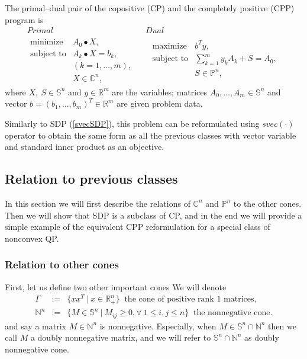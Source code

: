 \documentclass[12pt]{book}
\theoremstyle{definition}
\begin{document}
\label{defCPandCPP}
The primal--dual pair of the copositive (CP) and the completely positive (CPP) program is
\begin{equation}
\label{cp&cpp} 
\begin{array}{cc}
Primal & Dual \\
\begin{array}{ll}
\mbox{minimize} & A_0\bullet X,\\
\mbox{subject to}& A_k\bullet X  = b_k, \ \\
 & ( k = 1,\dots ,m), \\
& X \in \mathbb{C}^n,
\end{array}
\ \  &  \ \
\begin{array}{ll}
\mbox{maximize} & b^Ty, \\
\mbox{subject to}& \sum_{k=1}^m y_kA_k + S  = A_0 ,\\
& S \in \mathbb{P}^n, \\
&
\end{array}
\end{array}
\end{equation}
where $X,\ S\in \mathbb{S}^n$ and $y\in \mathbb{R}^m$ are the variables;  matrices $A_0,\dots ,A_m\in \mathbb{S}^n$ and vector $b=(b_1,\dots ,b_m)^T\in \mathbb{R}^m$ are given problem data.

Similarly to SDP (\ref{svecSDP}), this problem can be reformulated using $svec(\cdot )$ operator to obtain the same form as all the previous classes with vector variable and standard inner product as an objective.
\subsection{Relation to previous classes}
In this section we will first describe the relations of $\mathbb{C}^n $ and $\mathbb{P}^n$ to the other cones. Then we will show that SDP is a subclass of CP, and in the end we will provide a simple example of the equivalent CPP reformulation for a special class of nonconvex QP.

\subsubsection{Relation to other cones}
First, let us define two other important cones
\label{defGammaAndNandDNNcones}
We will denote 
\begin{eqnarray*}
\Gamma &:=& \{ xx^T \ \vert \ x\in\mathbb{R}^n_+ \}  \ \mbox{ the cone of positive rank 1 matrices}, \\
\mathbb{N}^n &:=& \{ M\in \mathbb{S}^n \ \vert \ M_{ij} \geq 0, \forall \ 1\leq i,j\leq n \} \ \mbox{ the nonnegative cone}.
\end{eqnarray*}
and say a matrix $M\in \mathbb{N}^n$ is nonnegative. Especially, when $M \in \mathbb{S}^n \cap \mathbb{N}^n$ then we call $M$ a doubly nonnegative matrix, and we will refer to $\mathbb{S}^n \cap \mathbb{N}^n$ as doubly nonnegative cone.
\end{document}

